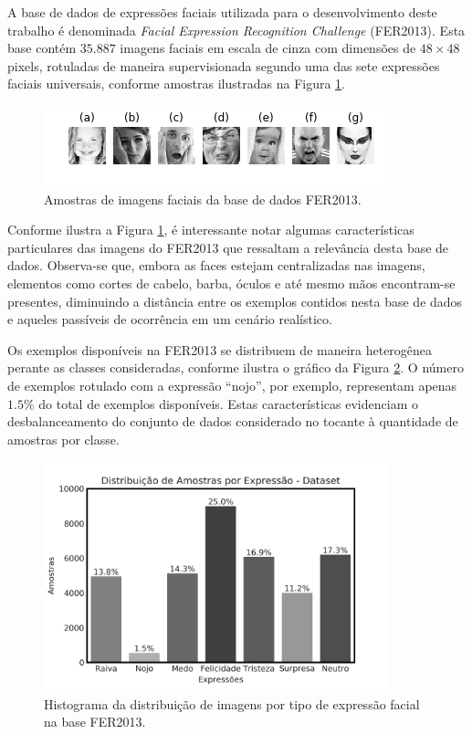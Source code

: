 A base de dados de expressões faciais utilizada para o desenvolvimento deste trabalho é denominada \emph{Facial Expression Recognition Challenge} (FER2013). Esta base contém $35.887$ imagens faciais em escala de cinza com dimensões de $48\times 48$ pixels, rotuladas de maneira supervisionada segundo uma das sete expressões faciais universais, conforme amostras ilustradas na Figura \ref{fig:samples}.

\begin{figure}[!htb]
    \centering
    \caption{Amostras de imagens faciais da base de dados FER2013.}
    \label{fig:samples}
    \includegraphics{images/samples.png}
\end{figure}

Conforme ilustra a Figura \ref{fig:samples}, é interessante notar algumas características particulares das imagens do FER2013 que ressaltam a relevância desta base de dados. Observa-se que, embora as faces estejam centralizadas nas imagens, elementos como cortes de cabelo, barba, óculos e até mesmo mãos encontram-se presentes, diminuindo a distância entre os exemplos contidos nesta base de dados e aqueles passíveis de ocorrência em um cenário realístico.

Os exemplos disponíveis na FER2013 se distribuem de maneira heterogênea perante as classes consideradas, conforme ilustra o gráfico da Figura \ref{fig:dataset}. O número de exemplos rotulado com a expressão ``nojo'', por exemplo, representam apenas $1.5\%$ do total de exemplos disponíveis. Estas características evidenciam o desbalanceamento do conjunto de dados considerado no tocante à quantidade de amostras por classe.

\begin{figure}[!htb]
    \centering
    \caption{Histograma da distribuição de imagens por tipo de expressão facial na base FER2013.}  \label{fig:dataset}
    \includegraphics[width=10cm]{images/expression_distribution.png}
\end{figure}

